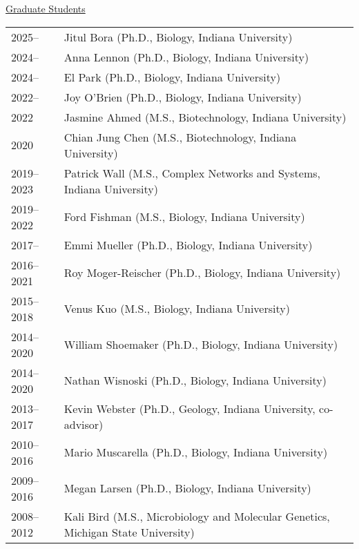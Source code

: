 \documentclass[11pt]{article}
\begin{document}
\vspace{1em}
\textnormal{\underline{Graduate Students}} \\[-2.5em]

\begin{longtable}{@{}p{4em}@{\hspace{2em}}p{}@{}}
2025--     & Jitul Bora (Ph.D., Biology, Indiana University) \\
2024--     & Anna Lennon (Ph.D., Biology, Indiana University) \\
2024--     & El Park (Ph.D., Biology, Indiana University) \\
2022--     & Joy O’Brien (Ph.D., Biology, Indiana University) \\
2022       & Jasmine Ahmed (M.S., Biotechnology, Indiana University) \\
2020       & Chian Jung Chen (M.S., Biotechnology, Indiana University) \\
2019--2023 & Patrick Wall (M.S., Complex Networks and Systems, Indiana University) \\
2019--2022 & Ford Fishman (M.S., Biology, Indiana University) \\
2017--     & Emmi Mueller (Ph.D., Biology, Indiana University) \\
2016--2021 & Roy Moger-Reischer (Ph.D., Biology, Indiana University) \\
2015--2018 & Venus Kuo (M.S., Biology, Indiana University) \\
2014--2020 & William Shoemaker (Ph.D., Biology, Indiana University) \\
2014--2020 & Nathan Wisnoski (Ph.D., Biology, Indiana University) \\
2013--2017 & Kevin Webster (Ph.D., Geology, Indiana University, co-advisor) \\
2010--2016 & Mario Muscarella (Ph.D., Biology, Indiana University) \\
2009--2016 & Megan Larsen (Ph.D., Biology, Indiana University) \\
2008--2012 & Kali Bird (M.S., Microbiology and Molecular Genetics, Michigan State University) \\
\end{longtable}
\end{document}
